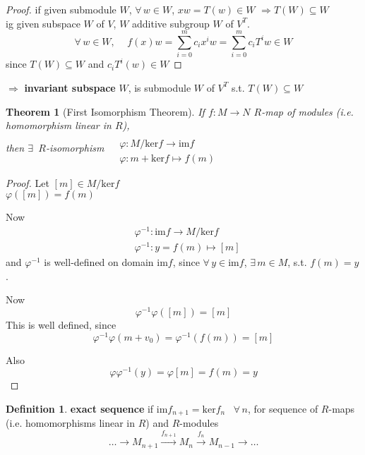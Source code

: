 \documentclass[twoside,landscape]{amsart}
\theoremstyle{plain}
\newtheorem{theorem}{Theorem}
\theoremstyle{definition}
\newtheorem{definition}{Definition}
\theoremstyle{remark}
\begin{document}
\begin{multicols*}{2}
\begin{enumerate}
\begin{proof}
  if given submodule $W$, $\forall \, w \in W$, $xw = T(w) \in W$ $\Longrightarrow T(W) \subseteq W$ \\
ig given subspace $W$ of $V$, $W$ additive subgroup $W$ of $V^T$.  
\[
\forall \, w \in W , \quad \, f(x)w = \sum_{i=0}^m c_ix^iw = \sum_{i=0}^m c_iT^iw \in W
\]
since $T(W) \subseteq W$ and $c_iT^i(w) \in W$
\end{proof}
$\Longrightarrow $ \textbf{invariant subspace } $W$, is submodule $W$ of $V^T$ s.t. $T(W) \subseteq W$
\end{enumerate}


\begin{theorem}[First Isomorphism Theorem]
  If $f:M\to N$ $R$-map of modules (i.e. homomorphism linear in $R$), \\
then $\exists \, $ $R$-isomorphism $\begin{aligned} & \quad \\
  & \varphi : M / \text{ker}{f} \to \text{im}{f} \\
  & \varphi : m + \text{ker}{f} \mapsto f(m) \end{aligned}$


\end{theorem}

\begin{proof}
Let $[m] \in M/\text{ker}{f}$ \\
\phantom{Let } $\varphi([m]) = f(m)$

Now 
\[
\begin{aligned}
  & \varphi^{-1} : \text{im}f \to M/\text{ker}f \\ 
  & \varphi^{-1}: y = f(m) \mapsto [m]
\end{aligned}
\]
and $\varphi^{-1}$ is well-defined on domain $\text{im}{f}$, since $\forall \, y \in \text{im}{f}$, $\exists \, m \in M$, s.t. $f(m)=y$.  

Now
\[
\varphi^{-1}\varphi([m]) = [m]
\]
This is well defined, since 
\[
\varphi^{-1}\varphi(m+v_0) = \varphi^{-1}(f(m)) = [m]
\]

Also
\[
\varphi \varphi^{-1}(y) = \varphi[m] = f(m) = y
\]
\end{proof}

\begin{definition}
  \textbf{exact sequence} if $\text{im}f_{n+1} = \text{ker}f_n$ \, $\forall \, n$, for sequence of $R$-maps (i.e. homomorphisms linear in $R$) and $R$-modules 
\[
\dots \to M_{n+1} \xrightarrow{ f_{n+1}} M_n \xrightarrow{ f_n} M_{n-1} \to \dots
\]
\end{definition}


\end{multicols*}
\end{document}
